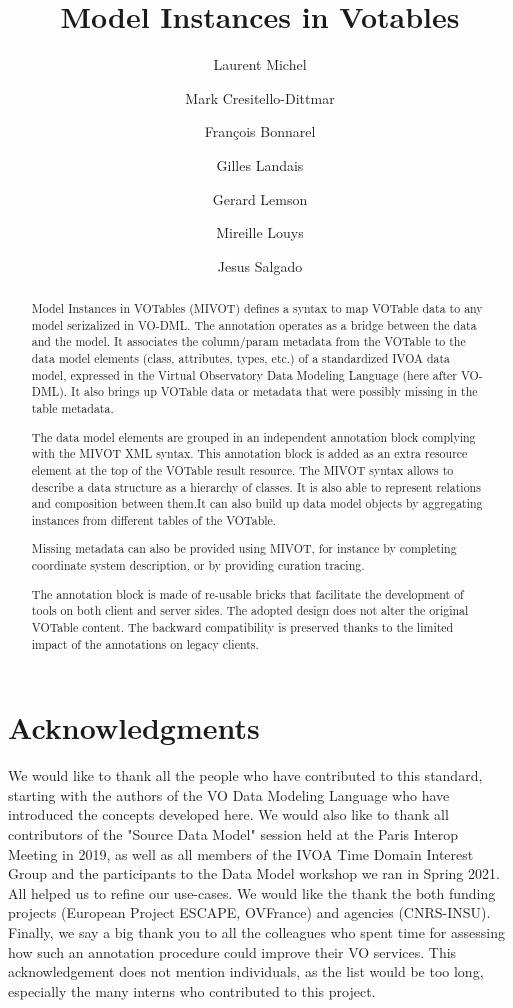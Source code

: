 \documentclass[11pt,a4paper]{ivoa}
\title{Model Instances in Votables}
\author{Laurent Michel}
\author{Mark Cresitello-Dittmar}
\author{François Bonnarel}
\author{Gilles Landais}
\author{Gerard Lemson}
\author{Mireille Louys}
\author{Jesus Salgado}
\begin{document}
\begin{abstract}
Model Instances in VOTables (MIVOT) defines a syntax to map VOTable data to any model serizalized in VO-DML.
The annotation operates as a bridge between the data and the model.
It associates the column/param metadata from the VOTable to the 
data model elements (class, attributes, types, etc.) of a standardized IVOA data model, expressed in the Virtual Observatory Data Modeling Language (here after VO-DML).
It also brings up VOTable data or metadata that were possibly missing in the table metadata.

The data model elements are grouped in an independent annotation block complying with the MIVOT XML syntax.
This annotation block is added as an extra resource element at the top of the VOTable result resource. 
The MIVOT syntax allows to describe a data structure as a hierarchy of classes. It is also able to represent relations and composition between them.It can also build up data model objects by aggregating instances from different tables of the VOTable.

Missing metadata can also be provided using MIVOT, for instance by completing coordinate system description, or by providing curation tracing.

The annotation block is made of re-usable bricks that facilitate the development of tools on both client and server sides.
The adopted design does not alter the original VOTable content. 
The backward compatibility is preserved thanks to the limited impact of the annotations on legacy clients.
\end{abstract}


\section*{Acknowledgments}
We would like to thank all the people who have contributed to this standard, starting with the authors of the VO Data Modeling Language who have introduced the concepts developed here.
We would also like to thank all contributors of the "Source Data Model" session held at the Paris Interop Meeting in 2019, as well as all members of the IVOA Time Domain Interest Group and the participants to the Data Model workshop we ran in Spring 2021. All helped us to refine our use-cases.
We would like the thank the both funding projects (European Project ESCAPE, OVFrance) and agencies (CNRS-INSU).
Finally, we say a big thank you to all the colleagues who spent time for assessing how such an annotation procedure could improve their VO services.
This acknowledgement does not mention individuals, as the list would be too long, especially the many interns who contributed to this project.
\end{document}
